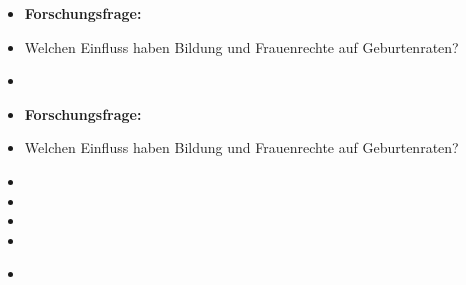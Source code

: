 \documentclass[aspectratio=169, journal, x11names, unknownkeysallowed, hyperref={colorlinks,
linkcolor = SS2,
urlcolor  = F3,
citecolor = F3,
anchorcolor = A4}, 12pt]{beamer}
\begin{document}
\begin{frame}[t]
  \begin{minipage}[t]{0.5\textwidth}
    \begin{itemize}
        \item[] \textbf{Forschungsfrage:}
        \item Welchen Einfluss haben Bildung und Frauenrechte auf Geburtenraten?
    \end{itemize}
  \end{minipage}%
  \begin{minipage}[t]{0.5\textwidth}
    \begin{itemize}
      \item[]  
    \end{itemize}
  \end{minipage}
\end{frame}

\begin{frame}[t]
  \begin{minipage}[t]{0.5\textwidth}
    \begin{itemize}
        \item[] \textbf{Forschungsfrage:}
        \item Welchen Einfluss haben Bildung und Frauenrechte auf Geburtenraten?
        \scriptsize
        \item[] 
        \item[]  
        \item[] 
        \item[] 
    \end{itemize}
  \end{minipage}%
  \begin{minipage}[t]{0.5\textwidth}
    \begin{itemize}
      \item[] 
    \end{itemize}
  \end{minipage}
\end{frame}
\end{document}
